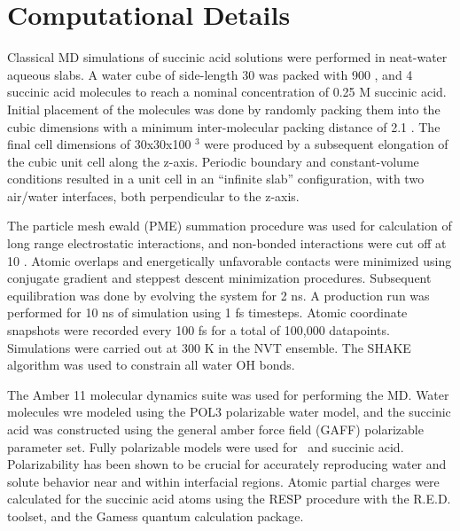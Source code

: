 \section {Computational Details}

Classical MD simulations of succinic acid solutions were performed in neat-water aqueous slabs. A water cube of side-length 30 \angs was packed with 900 \wat, and 4 succinic acid molecules to reach a nominal concentration of 0.25 M succinic acid. Initial placement of the molecules was done by randomly packing them into the cubic dimensions with a minimum inter-molecular packing distance of 2.1 \angs.\cite{Martinez2009, Martinez2003} The final cell dimensions of 30x30x100 \angs$^3$ were produced by a subsequent elongation of the cubic unit cell along the z-axis. Periodic boundary and constant-volume conditions resulted in a unit cell in an ``infinite slab'' configuration, with two air/water interfaces, both perpendicular to the z-axis.\cite{Wilson1991}

The particle mesh ewald (PME) summation procedure was used for calculation of long range electrostatic interactions, and non-bonded interactions were cut off at 10 \angs.\cite{Essmann1995} Atomic overlaps and energetically unfavorable contacts were minimized using conjugate gradient and steppest descent minimization procedures. Subsequent equilibration was done by evolving the system for 2 ns. A production run was performed for 10 ns of simulation using 1 fs timesteps. Atomic coordinate snapshots were recorded every 100 fs for a total of 100,000 datapoints. Simulations were carried out at 300 K in the NVT ensemble. The SHAKE algorithm was used to constrain all water OH bonds.\cite{Ryckaert1977}

The Amber 11 molecular dynamics suite was used for performing the MD.\cite{Case2010} Water molecules wre modeled using the POL3 polarizable water model,\cite{Dang1992, Caldwell1995} and the succinic acid was constructed using the general amber force field (GAFF) polarizable parameter set.\cite{Wang2004} Fully polarizable models were used for \wat~and succinic acid. Polarizability has been shown to be crucial for accurately reproducing water and solute behavior near and within interfacial regions.\cite{Dang1998} Atomic partial charges were calculated for the succinic acid atoms using the RESP procedure with the R.E.D. toolset, and the Gamess quantum calculation package.\cite{Pigache2004, Dupradeau2010, Schmidt1993}
